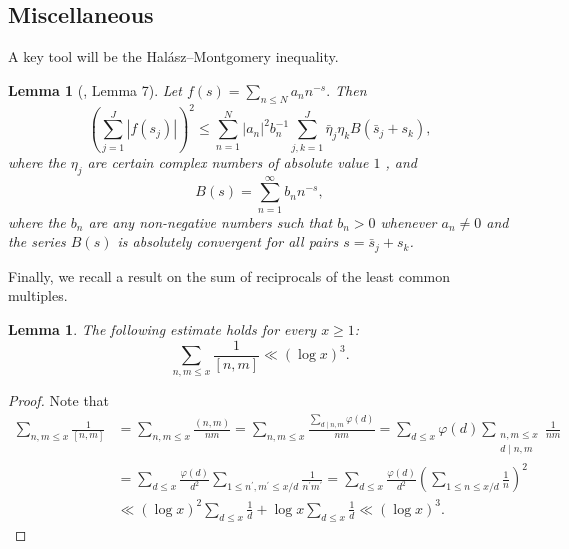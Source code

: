 \documentclass[reqno]{amsart}
\newtheorem{lemma}[theorem]{Lemma}
\numberwithin{equation}{section}
\theoremstyle{remark}
\begin{document}
\subsection{Miscellaneous}
A key tool will be the Hal\'asz--Montgomery inequality.
\begin{lemma} [\cite{jutila77}, Lemma 7]\label{lemma7jutila}
Let $f(s)=\sum_{n\le N} a_n  n^{-s}.
$ Then
$$
\left(\sum_{j=1}^J\left|f\left(s_j\right)\right|\right)^2 \leq \sum_{n=1}^N\left|a_n\right|^2 b_n^{-1} \sum_{j, k=1}^J \bar{\eta}_j \eta_k B\left(\bar{s}_j+s_k\right),
$$
where the $\eta_j$ are certain complex numbers of absolute value $1$ , and
$$
B(s)=\sum_{n=1}^{\infty} b_n n^{-s},
$$
where the $b_n$ are any non-negative numbers such that $b_n>0$ whenever $a_n \neq 0$ and the series $B(s)$ is absolutely convergent for all pairs $s=\bar{s}_j+s_k$.
\end{lemma}

Finally, we recall a result on the sum of reciprocals of the least common multiples.
\begin{lemma}\label{reciprocalgcd}The following estimate holds for every $x\ge 1$:
    \[
    \sum_{n,m\le x}\frac{1}{[n,m]}\ll (\log x)^3.
    \]
\end{lemma}
\begin{proof}
    Note that
    \begin{equation*}
\begin{aligned}
 \sum_{n,m\le x}\frac{1}{[n,m]}&=\sum_{n,m\leq x} \frac{(n, m)}{nm} =\sum_{n,m\le x} \frac{\sum_{d \mid n, m} \varphi(d)}{nm} =\sum_{d \leq x} \varphi(d) \sum_{\substack{ n, m \leq x\\ d \mid n, m}} \frac{1}{nm} \\&=\sum_{d \leq x} \frac{\varphi(d)}{d^2} \sum_{1 \leq n^{\prime}, m^{\prime} \leq x / d} \frac{1}{n^{\prime} m^{\prime}}=\sum_{d \leq x} \frac{\varphi(d)}{d^2}\left(\sum_{1 \leq n \leq x / d} \frac{1}{n}\right)^2\\
 &\ll (\log x)^2\sum_{d \leq x}\frac{1}{d}+\log x\sum_{d \leq x}\frac{1}{d}\ll (\log x)^3.
\end{aligned}
\end{equation*}
\end{proof}
\end{document}
